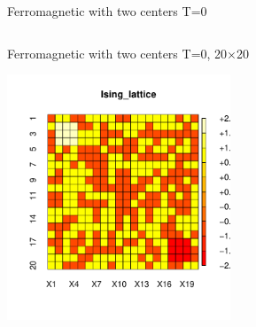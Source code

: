 \documentclass{beamer}
\begin{document}
\begin{frame}{Ferromagnetic with two centers T=0}
\begin{columns}
\begin{column}{0.5\textwidth}
\begin{center}
     \end{center}
\end{column}
\end{columns}
\end{frame}


\begin{frame}{Ferromagnetic with two centers T=0, 20$\times$20}
    \begin{center}
     \includegraphics[width=0.5\textwidth]{Pic/LATTICE20x20TWOCENTER.pdf}
     \end{center}
\end{frame}
\end{document}
